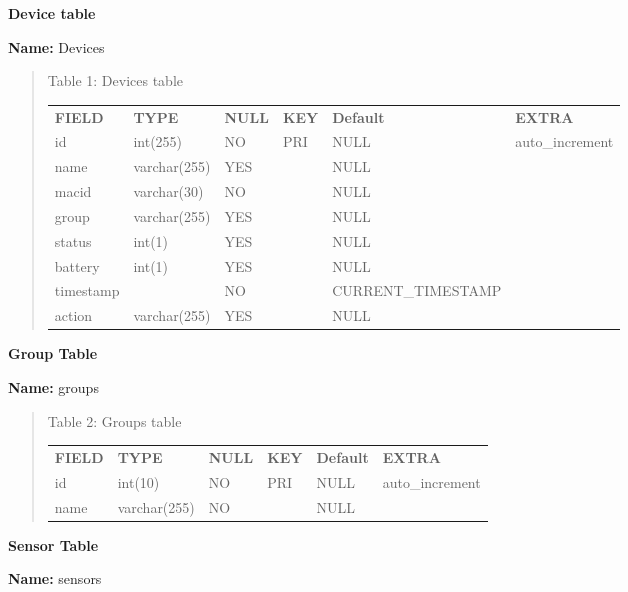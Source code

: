\documentclass[16pt]{article}
\begin{document}
\textbf{Device table}

\textbf{Name:} Devices

\begin{quote}

	\centering
	 \caption{Table 1: Devices table}
	\label{my-label}
	\begin{tabular}{llllll}
		{\bf FIELD} & {\bf TYPE}   & {\bf NULL} & {\bf KEY} & {\bf Default}      & {\bf EXTRA}     \\
		id          & int(255)     & NO         & PRI       & NULL               & auto\_increment \\
		name        & varchar(255) & YES        &           & NULL               &                 \\
		macid       & varchar(30)  & NO         &           & NULL               &                 \\
		group       & varchar(255) & YES        &           & NULL               &                 \\
		status      & int(1)       & YES        &           & NULL               &                 \\
		battery     & int(1)       & YES        &           & NULL               &                 \\
		timestamp   &              & NO         &           & CURRENT\_TIMESTAMP &                 \\
		action      & varchar(255) & YES        &           & NULL               &                
	\end{tabular}
	
\end{quote}
\textbf{Group Table}

\textbf{Name:} groups

\begin{quote}
	\centering
	\caption{Table 2: Groups table}
	\label{my-label}
	\begin{tabular}{llllll}
		{\bf FIELD} & {\bf TYPE}   & {\bf NULL} & {\bf KEY} & {\bf Default} & {\bf EXTRA}     \\
		id          & int(10)      & NO         & PRI       & NULL          & auto\_increment \\
		name        & varchar(255) & NO         &           & NULL          &                
	\end{tabular}

\end{quote}
\textbf{Sensor Table}

\textbf{Name:} sensors
\end{document}
